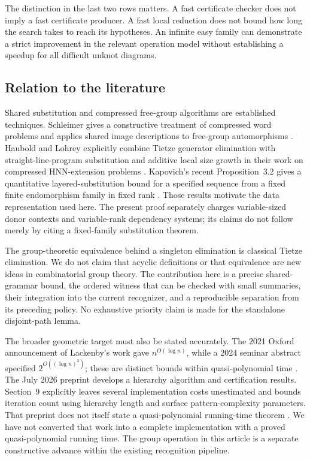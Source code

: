 The distinction in the last two rows matters. A fast certificate checker
does not imply a fast certificate producer. A fast local reduction does not
bound how long the search takes to reach its hypotheses. An infinite easy
family can demonstrate a strict improvement in the relevant operation
model without establishing a speedup for all difficult unknot diagrams.

\subsection{Relation to the literature}

Shared substitution and compressed free-group algorithms are established
techniques. Schleimer gives a constructive treatment of compressed word
problems and applies shared image descriptions to free-group automorphisms
\cite{Schleimer2008}. Haubold and Lohrey explicitly combine Tietze generator
elimination with straight-line-program substitution and additive local size
growth in their work on compressed HNN-extension problems
\cite{HauboldLohrey2011}. Kapovich's recent Proposition~3.2 gives a quantitative
layered-substitution bound for a specified sequence from a fixed finite
endomorphism family in fixed rank \cite{Kapovich2026}. Those results motivate
the data representation used here. The present proof separately charges
variable-sized donor contexts and variable-rank dependency systems; its
claims do not follow merely by citing a fixed-family substitution theorem.

The group-theoretic equivalence behind a singleton elimination is classical
Tietze elimination. We do not claim that acyclic definitions or that
equivalence are new ideas in combinatorial group theory. The contribution
here is a precise shared-grammar bound, the ordered witness that can be
checked with small summaries, their integration into the current recognizer,
and a reproducible separation from its preceding policy. No exhaustive
priority claim is made for the standalone disjoint-path lemma.

The broader geometric target must also be stated accurately. The 2021
Oxford announcement of Lackenby's work gave $n^{O(\log n)}$, while a 2024
seminar abstract specified $2^{O((\log n)^3)}$; these are distinct bounds
within quasi-polynomial time \cite{Lackenby2021Talk,Lackenby2024Talk}.
The July 2026 preprint develops a hierarchy algorithm and certification
results. Section~9 explicitly leaves several implementation costs
unestimated and bounds iteration count using hierarchy length and surface
pattern-complexity parameters. That preprint does not itself state a
quasi-polynomial running-time theorem \cite{Lackenby2026Hierarchy}. We have not
converted that work into a complete implementation with a proved
quasi-polynomial running time. The group operation in this article is a
separate constructive advance within the existing recognition pipeline.

